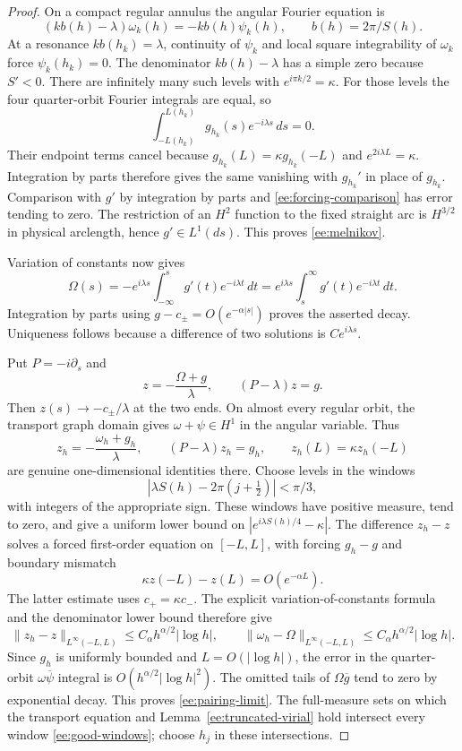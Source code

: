 \documentclass[reqno,11pt]{amsart}
\numberwithin{equation}{section}
\theoremstyle{remark}
\begin{document}
\begin{proof}
On a compact regular annulus the angular Fourier equation is
\[
 (kb(h)-\lambda)\omega_k(h)=-kb(h)\psi_k(h),
 \qquad b(h)=2\pi/S(h).
\]
At a resonance $kb(h_k)=\lambda$, continuity of $\psi_k$ and
local square integrability of $\omega_k$ force
$\psi_k(h_k)=0$. The denominator $kb(h)-\lambda$ has a simple
zero because $S'<0$.
There are infinitely many such levels with
$e^{i\pi k/2}=\kappa$. For those levels the four quarter-orbit
Fourier integrals are equal, so
\[
 \int_{-L(h_k)}^{L(h_k)}g_{h_k}(s)e^{-i\lambda s}\,ds=0.
\]
Their endpoint terms cancel because
$g_{h_k}(L)=\kappa g_{h_k}(-L)$ and
$e^{2i\lambda L}=\kappa$. Integration by parts therefore gives
the same vanishing with $g_{h_k}'$ in place of $g_{h_k}$.
Comparison with $g'$ by integration by parts and
\eqref{ee:forcing-comparison} has error tending to zero. The
restriction of an $H^2$ function to the fixed straight arc is
$H^{3/2}$ in physical arclength, hence $g'\in L^1(ds)$.
This proves \eqref{ee:melnikov}.

Variation of constants now gives
\[
 \Omega(s)=-e^{i\lambda s}\int_{-\infty}^s
                         g'(t)e^{-i\lambda t}\,dt
          =e^{i\lambda s}\int_s^\infty
                         g'(t)e^{-i\lambda t}\,dt.
\]
Integration by parts using $g-c_\pm=O(e^{-\alpha|s|})$
proves the asserted decay. Uniqueness follows because a difference
of two solutions is $Ce^{i\lambda s}$.

Put $P=-i\partial_s$ and
\[
 z=-\frac{\Omega+g}{\lambda},\qquad (P-\lambda)z=g.
\]
Then $z(s)\to-c_\pm/\lambda$ at the two ends. On almost every
regular orbit, the transport graph domain gives
$\omega+\psi\in H^1$ in the angular variable. Thus
\[
 z_h=-\frac{\omega_h+g_h}{\lambda},\qquad
 (P-\lambda)z_h=g_h,
 \qquad z_h(L)=\kappa z_h(-L)
\]
are genuine one-dimensional identities there.
Choose levels in the windows
\begin{equation}\label{ee:good-windows}
 |\lambda S(h)-2\pi(j+\tfrac12)|<\pi/3,
\end{equation}
with integers of the appropriate sign. These windows have positive
measure, tend to zero, and give a uniform lower bound on
$|e^{i\lambda S(h)/4}-\kappa|$. The difference $z_h-z$ solves
a forced first-order equation on $[-L,L]$, with forcing $g_h-g$
and boundary mismatch
\[
 \kappa z(-L)-z(L)=O(e^{-\alpha L}).
\]
The latter estimate uses $c_+=\kappa c_-$. The explicit
variation-of-constants formula and the denominator lower bound
therefore give
\[
 \|z_h-z\|_{L^\infty(-L,L)}
       \le C_\alpha h^{\alpha/2}|\log h|,
 \qquad
 \|\omega_h-\Omega\|_{L^\infty(-L,L)}
       \le C_\alpha h^{\alpha/2}|\log h|.
\]
Since $g_h$ is uniformly bounded and $L=O(|\log h|)$, the error in
the quarter-orbit $\omega\overline\psi$ integral is
$O(h^{\alpha/2}|\log h|^2)$. The omitted tails of
$\Omega\overline g$ tend to zero by exponential decay. This proves
\eqref{ee:pairing-limit}. The full-measure sets on which the
transport equation and Lemma~\ref{ee:truncated-virial} hold
intersect every window \eqref{ee:good-windows}; choose $h_j$ in
these intersections.
\end{proof}
\end{document}
